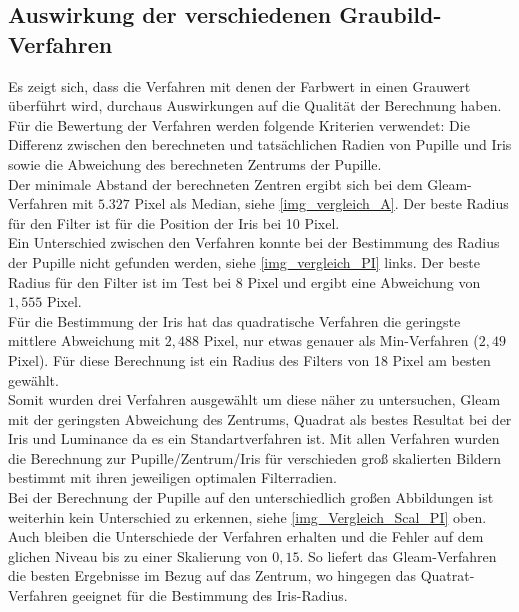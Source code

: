 \subsection{Auswirkung der verschiedenen Graubild-Verfahren}
\label{grau_Auswirkung_ElSe}
Es zeigt sich, dass die Verfahren mit denen der Farbwert in einen Grauwert überführt wird, durchaus Auswirkungen auf die Qualität der Berechnung haben.\\
Für die Bewertung der Verfahren werden folgende Kriterien verwendet: Die Differenz zwischen den berechneten und tatsächlichen Radien von Pupille und Iris sowie die Abweichung des berechneten Zentrums der Pupille.\\
Der minimale Abstand der berechneten Zentren ergibt sich bei dem Gleam-Verfahren mit $5.327$ Pixel als Median, siehe \autoref{img_vergleich_A}. Der beste Radius für den Filter ist für die Position der Iris bei 10 Pixel.\\
Ein Unterschied zwischen den Verfahren konnte bei der Bestimmung des Radius der Pupille nicht gefunden werden, siehe \autoref{img_vergleich_PI} links. Der beste Radius für den Filter ist im Test bei 8 Pixel und ergibt eine Abweichung von $1,555$ Pixel.\\
Für die Bestimmung der Iris hat das quadratische Verfahren die geringste mittlere Abweichung mit $2,488$ Pixel, nur etwas genauer als Min-Verfahren ($2,49$ Pixel). Für diese Berechnung ist ein Radius des Filters von 18 Pixel am besten gewählt.\\
Somit wurden drei Verfahren ausgewählt um diese näher zu untersuchen, Gleam mit der geringsten Abweichung des Zentrums, Quadrat als bestes Resultat bei der Iris und Luminance da es ein Standartverfahren ist. Mit allen Verfahren wurden die Berechnung zur Pupille/Zentrum/Iris für verschieden groß skalierten Bildern bestimmt mit ihren jeweiligen optimalen Filterradien.\\
Bei der Berechnung der Pupille auf den unterschiedlich großen Abbildungen ist weiterhin kein Unterschied zu erkennen, siehe \autoref{img_Vergleich_Scal_PI} oben.\\
Auch bleiben die Unterschiede der Verfahren erhalten und die Fehler auf dem glichen Niveau bis zu einer Skalierung von $0,15$. So liefert das Gleam-Verfahren die besten Ergebnisse im Bezug auf das Zentrum, wo hingegen das Quatrat-Verfahren geeignet für die Bestimmung des Iris-Radius. 
